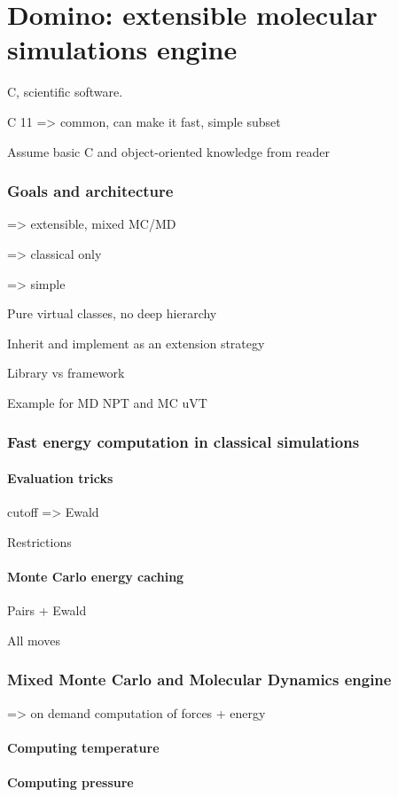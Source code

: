 \documentclass[thesis]{subfiles}
\begin{document}
\def\cxx{{C\nolinebreak[4]\hspace{-.05em}\raisebox{.3ex}{\footnotesize ++}}\xspace}

\chapter{Domino: extensible molecular simulations engine}

\cxx, scientific software.

\cxx11 => common, can make it fast, simple subset

Assume basic \cxx and object-oriented knowledge from reader

\subsection{Goals and architecture}

=> extensible, mixed MC/MD

=> classical only

=> simple

Pure virtual classes, no deep hierarchy

Inherit and implement as an extension strategy

Library vs framework

Example for MD NPT and MC uVT

\subsection{Fast energy computation in classical simulations}

\subsubsection{Evaluation tricks}

cutoff => Ewald

Restrictions

\subsubsection{Monte Carlo energy caching}

Pairs + Ewald

All moves

\subsection{Mixed Monte Carlo and Molecular Dynamics engine}

=> on demand computation of forces + energy

\subsubsection{Computing temperature}

\subsubsection{Computing pressure}
\end{document}
